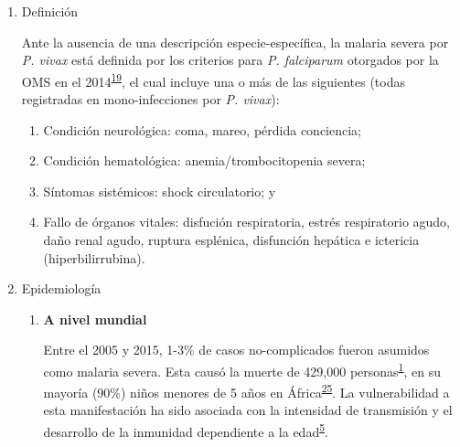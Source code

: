 \documentclass[a4paper]{article}
\providecommand{\tightlist}{%
  \setlength{\itemsep}{0pt}\setlength{\parskip}{0pt}}
\begin{document}
\begin{enumerate}
\def\labelenumi{\alph{enumi}.}
\item
  Definición

  Ante la ausencia de una descripción especie-específica, la malaria
  severa por \emph{P. vivax} está definida por los criterios para
  \emph{P. falciparum} otorgados por la OMS en el
  2014\textsuperscript{\protect\hyperlink{ref-WHO2014severe}{19}}, el
  cual incluye una o más de las siguientes (todas registradas en
  mono-infecciones por \emph{P. vivax}):

  \begin{enumerate}
  \def\labelenumii{\arabic{enumii}.}
  \tightlist
  \item
    Condición neurológica: coma, mareo, pérdida conciencia;
  \item
    Condición hematológica: anemia/trombocitopenia severa;
  \item
    Síntomas sistémicos: shock circulatorio; y
  \item
    Fallo de órganos vitales: disfución respiratoria, estrés
    respiratorio agudo, daño renal agudo, ruptura esplénica, disfunción
    hepática e ictericia (hiperbilirrubina).
  \end{enumerate}
\item
  Epidemiología

  \begin{enumerate}
  \def\labelenumii{\roman{enumii}.}
  \item
    \textbf{A nivel mundial}

    Entre el 2005 y 2015, 1-3\% de casos no-complicados fueron asumidos
    como malaria severa. Esta causó la muerte de 429,000
    personas\textsuperscript{\protect\hyperlink{ref-WHO2016world}{1}},
    en su mayoría (90\%) niños menores de 5 años en
    África\textsuperscript{\protect\hyperlink{ref-wassmer2015}{25}}. La
    vulnerabilidad a esta manifestación ha sido asociada con la
    intensidad de transmisión y el desarrollo de la inmunidad
    dependiente a la
    edad\textsuperscript{\protect\hyperlink{ref-reyburn2015}{5}}.


\end{enumerate}
\end{enumerate}
\end{document}
